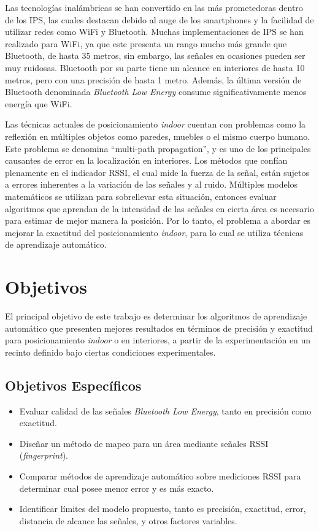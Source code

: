 Las tecnologías inalámbricas se han convertido en las más prometedoras dentro de los IPS, las cuales destacan debido al auge de los smartphones y la facilidad de utilizar redes como WiFi y Bluetooth. Muchas implementaciones de IPS se han realizado para WiFi, ya que este presenta un rango mucho más grande que Bluetooth, de hasta 35 metros, sin embargo, las señales en ocasiones pueden ser muy ruidosas. Bluetooth por su parte tiene un alcance en interiores de hasta 10 metros, pero con una precisión de hasta 1 metro.  Además, la última versión de Bluetooth denominada \textit{Bluetooth Low Energy} consume significativamente menos energía que WiFi.

Las técnicas actuales de posicionamiento \textit{indoor} cuentan con problemas como la reflexión en múltiples objetos como paredes, muebles o el mismo cuerpo humano. Este problema se denomina  “multi-path propagation”, y es uno de los principales causantes de error en la localización en interiores. Los métodos que confían plenamente en el indicador RSSI, el cual mide la fuerza de la señal, están sujetos a errores inherentes a la variación de las señales y al ruido.  Múltiples modelos matemáticos se utilizan para sobrellevar esta situación, entonces evaluar algoritmos que aprendan de la intensidad de las señales en cierta área es necesario para estimar de mejor manera la posición. Por lo tanto, el problema a abordar es mejorar la exactitud del posicionamiento \textit{indoor}, para lo cual se utiliza técnicas de aprendizaje automático.

\section{Objetivos}

El principal objetivo de este trabajo es determinar los algoritmos de aprendizaje automático que presenten mejores resultados en términos de precisión y exactitud para posicionamiento \textit{indoor} o en interiores, a partir de la experimentación en un recinto definido bajo ciertas condiciones experimentales.

\subsection{Objetivos Específicos}

\begin{itemize}
\item Evaluar calidad de las señales \textit{Bluetooth Low Energy}, tanto en precisión como exactitud.

\item Diseñar un método de mapeo para un área mediante señales RSSI (\textit{fingerprint}).

\item Comparar métodos de aprendizaje automático sobre mediciones RSSI para determinar cual posee menor error y es más exacto.

\item Identificar límites del modelo propuesto, tanto es precisión, exactitud, error, distancia de alcance las señales, y otros factores variables.

\end{itemize}